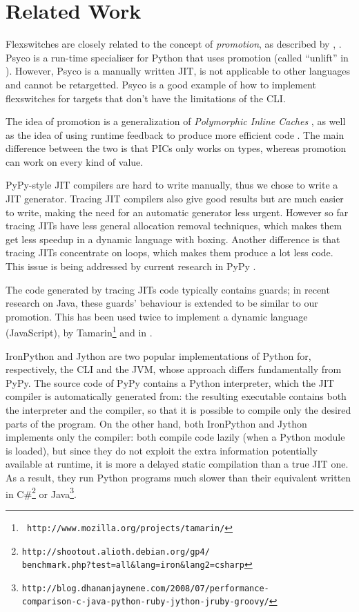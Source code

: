 \section{Related Work}

Flexswitches are closely related to the concept of \emph{promotion}, as
described by \cite{PyPyJIT}, \cite{PyPyJIT09}.
Psyco is
a run-time specialiser for Python that uses promotion (called ``unlift'' in
\cite{DBLP:conf/pepm/Rigo04}). However, Psyco is a manually written JIT, is
not applicable to other languages and cannot be retargetted.  Psyco is a 
good example of how to implement flexswitches for targets that don't have the
limitations of the CLI.

The idea of promotion is a generalization of \emph{Polymorphic
  Inline Caches} \cite{hoelzle_optimizing_1991}, as well as the idea of using
runtime feedback to produce more efficient code
\cite{hoelzle_type_feedback_1994}.  The main difference between the two is 
that PICs only works on types, whereas promotion can work on every kind of value.

PyPy-style JIT compilers are hard to write manually, thus we chose to write a
JIT generator.  Tracing JIT compilers \cite{gal_hotpathvm_2006} also give
good results but are much easier to write, making the need for an automatic
generator less urgent.  However so far tracing JITs have less general
allocation removal techniques, which makes them get less speedup in a dynamic
language with boxing.  Another difference is that tracing JITs concentrate on
loops, which makes them produce a lot less code.  This issue is being addressed
by current research in PyPy \cite{PyPyTracing}.

The code generated by tracing JITs code typically contains guards; in recent research
\cite{gal_incremental_2006} on Java, these guards' behaviour is extended to be
similar to our promotion.  This has been used twice to implement a dynamic
language (JavaScript), by Tamarin\footnote{{\tt
http://www.mozilla.org/projects/tamarin/}} and in \cite{chang_efficient_2007}.

IronPython and Jython are two popular implementations of Python for,
respectively, the CLI and the JVM, whose approach differs fundamentally from
PyPy.  The source code of PyPy contains a Python interpreter, which the JIT
compiler is automatically generated from: the resulting executable contains
both the interpreter and the compiler, so that it is possible to compile only
the desired parts of the program.  On the other hand, both IronPython and
Jython implements only the compiler: both compile code lazily (when a Python
module is loaded), but since they do not exploit the extra information
potentially available at runtime, it is more a delayed static compilation than
a true JIT one.  As a result, they run Python programs much slower than their
equivalent written in
C\#\footnote{\texttt{http://shootout.alioth.debian.org/gp4/\\benchmark.php?test=all\&lang=iron\&lang2=csharp}}
or
Java\footnote{\texttt{http://blog.dhananjaynene.com/2008/07/performance-\\comparison-c-java-python-ruby-jython-jruby-groovy/}}.


